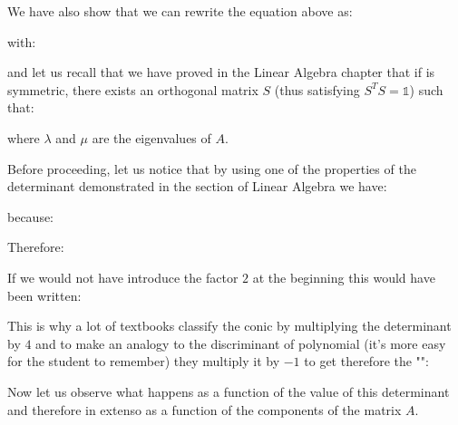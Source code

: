 	We have also show that we can rewrite the equation above as:
	
	with:
	
	and let us recall that we have proved in the Linear Algebra chapter that if is symmetric, there exists an orthogonal matrix $S$ (thus satisfying $S^TS=\mathds{1}$) such that:
	
 	where $\lambda$ and $\mu$ are the eigenvalues of $A$.

	Before proceeding, let us notice that by using one of the properties of the determinant demonstrated in the section of Linear Algebra we have:
	
	because:
	
	Therefore:
	
	\begin{tcolorbox}[title=Remark,colframe=black,arc=10pt]
	If we would not have introduce the factor $2$ at the beginning this would have been written:
	
	This is why a lot of textbooks classify the conic by multiplying the determinant by $4$ and to make an analogy to the discriminant of polynomial (it's more easy for the student to remember) they multiply it by $-1$ to get therefore the "":
	
	\end{tcolorbox}
 	Now let us observe what happens as a function of the value of this determinant and therefore in extenso as a function of the components of the matrix $A$.


